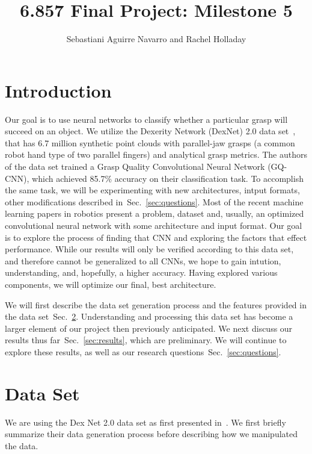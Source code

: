 \documentclass[letterpaper, 10 pt, conference]{../ieeeconf}
\newcommand{\sref}[1]{Sec.~\ref{#1}} %
\begin{document}
\title{6.857 Final Project: Milestone 5}
\author{Sebastiani Aguirre Navarro and Rachel Holladay}
\maketitle

\section{Introduction}
Our goal is to use neural networks to classify whether a particular grasp will succeed on an object.
We utilize the Dexerity Network (DexNet) 2.0 data set~\cite{mahler2017dex}, that has 6.7 million synthetic point clouds with parallel-jaw grasps (a common robot hand type of two parallel fingers) and analytical grasp metrics.
The authors of the data set trained a Grasp Quality Convolutional Neural Network (GQ-CNN), which achieved 85.7\% accuracy on their classification task.
To accomplish the same task, we will be experimenting with new architectures, intput formats, other modifications described in~\sref{sec:questions}.
Most of the recent machine learning papers in robotics present a problem, dataset and, usually, an optimized convolutional neural network with some architecture and input format. 
Our goal is to explore the process of finding that CNN and exploring the factors that effect performance. 
While our results will only be verified according to this data set, and therefore cannot be generalized to all CNNs, we hope to gain intution, understanding, and, hopefully, a higher accuracy. 
Having explored various components, we will optimize our final, best architecture. 

We will first describe the data set generation process and the features provided in the data set~\sref{sec:data_set}. 
Understanding and processing this data set has become a larger element of our project then previously anticipated. 
We next discuss our results thus far~\sref{sec:results}, which are preliminary. 
We will continue to explore these results, as well as our research questions~\sref{sec:questions}. 


\section{Data Set}
\label{sec:data_set}
We are using the Dex Net 2.0 data set as first presented in~\cite{mahler2017dex}. 
We first briefly summarize their data generation process before describing how we manipulated the data. 
\end{document}
